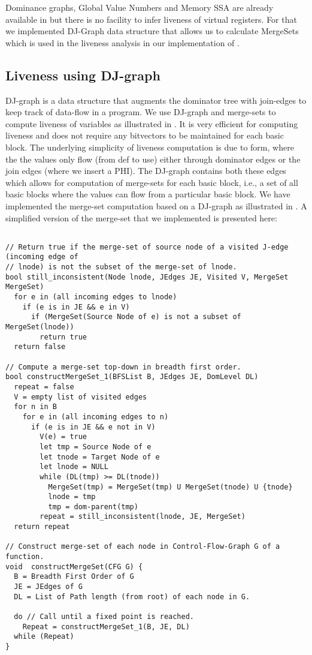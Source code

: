 \documentclass[acmlarge,review,anonymous]{acmart}\settopmatter{printfolios=true}
\begin{document}
Dominance graphs, Global Value Numbers and Memory SSA are already available in
\LLVM{} but there is no facility to infer liveness of virtual registers. For
that we implemented DJ-Graph data structure that allows us to calculate
MergeSets which is used in the liveness analysis in our implementation of \GCM{}.

\subsection{Liveness using DJ-graph}
DJ-graph \cite{Sreedhar1996} is a data structure that augments the dominator
tree with join-edges to keep track of data-flow in a program. We use DJ-graph
and merge-sets to compute liveness of variables as illustrated in
\cite{das2012}.  It is very efficient for computing liveness and does not
require any bitvectors to be maintained for each basic block. The underlying
simplicity of liveness computation is due to \SSA{} form, where the the values
only flow (from def to use) either through dominator edges or the join edges
(where we insert a PHI). The DJ-graph contains both these edges which allows for
computation of merge-sets for each basic block, i.e., a set of all basic blocks
where the values can flow from a particular basic block. We have implemented the
merge-set computation based on a DJ-graph as illustrated in \cite{das2005}. A
simplified version of the merge-set that we implemented is presented here:

\begin{verbatim}

// Return true if the merge-set of source node of a visited J-edge (incoming edge of
// lnode) is not the subset of the merge-set of lnode.
bool still_inconsistent(Node lnode, JEdges JE, Visited V, MergeSet MergeSet)
  for e in (all incoming edges to lnode)
    if (e is in JE && e in V)
      if (MergeSet(Source Node of e) is not a subset of MergeSet(lnode))
        return true
  return false

// Compute a merge-set top-down in breadth first order.
bool constructMergeSet_1(BFSList B, JEdges JE, DomLevel DL)
  repeat = false
  V = empty list of visited edges
  for n in B
    for e in (all incoming edges to n)
      if (e is in JE && e not in V)
        V(e) = true
        let tmp = Source Node of e
        let tnode = Target Node of e
        let lnode = NULL
        while (DL(tmp) >= DL(tnode))
          MergeSet(tmp) = MergeSet(tmp) U MergeSet(tnode) U {tnode}
          lnode = tmp
          tmp = dom-parent(tmp)
        repeat = still_inconsistent(lnode, JE, MergeSet)
  return repeat

// Construct merge-set of each node in Control-Flow-Graph G of a function.
void  constructMergeSet(CFG G) {
  B = Breadth First Order of G
  JE = JEdges of G
  DL = List of Path length (from root) of each node in G.

  do // Call until a fixed point is reached.
    Repeat = constructMergeSet_1(B, JE, DL)
  while (Repeat)
}
\end{verbatim}
\end{document}
